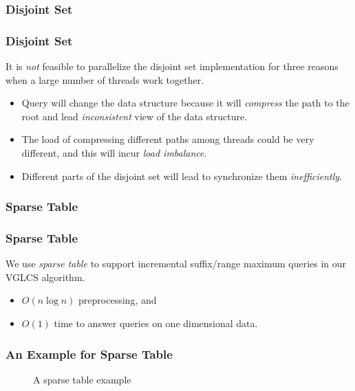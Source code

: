 \subsubsection{Disjoint Set}
\begin{frame}
    \frametitle{Disjoint Set}
    It is {\em not} feasible to parallelize the disjoint set
	implementation for three reasons when a large number of threads work
	together.

	\begin{itemize}
		\setlength\itemsep{1em}
		\item
			{\sc Query} will change the data structure because it will
			{\em compress} the path to the root and lead {\em
			inconsistent} view of the data structure.
		\item 
			The load of compressing different paths among threads could
			be very different, and this will incur {\em load imbalance}.
		\item 
			Different parts of the disjoint set will lead to synchronize
			them {\em inefficiently}.
	\end{itemize}
\end{frame}

\subsubsection{Sparse Table}
\begin{frame}
    \frametitle{Sparse Table}
	We use {\em sparse table} to support incremental suffix/range
	maximum queries in our VGLCS algorithm.

	\begin{itemize}
		\setlength\itemsep{1em}
		\item 
			$O(n \log n)$ preprocessing, and 
		\item 
			$O(1)$ time to answer queries on one dimensional data.
	\end{itemize}
\end{frame}

\begin{withoutheadline}
\begin{frame}
	\frametitle{An Example for Sparse Table}
	\begin{figure}[!thb]
	  \centering {} 
	  \caption{A sparse table example}
	  \label{fig:interval-decomposition}
	\end{figure}
\end{frame}
\end{withoutheadline}

